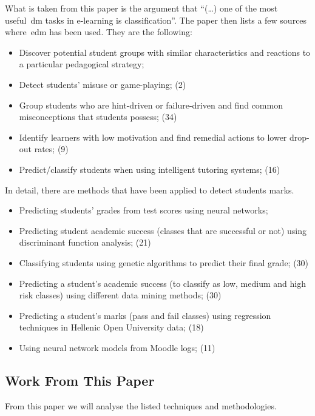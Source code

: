 What is taken from this paper is the argument that ``(\dots) one of the most
useful~\gls{dm} tasks in e-learning is classification''. The paper then lists a
few sources where~\gls{edm} has been used. They are the following:

\begin{itemize}
    \item Discover potential student groups with similar characteristics and
        reactions to a particular pedagogical strategy;~\cite{ind_008}
    \item Detect students' misuse or game-playing; (2)
    \item Group students who are hint-driven or failure-driven and find common
        misconceptions that students possess; (34)
    \item Identify learners with low motivation and find remedial actions to
        lower drop-out rates; (9)
    \item Predict/classify students when using intelligent tutoring systems;
        (16)
\end{itemize}

In detail, there are methods that have been applied to detect students marks.

\begin{itemize}
    \item Predicting students' grades from test scores using neural
        networks;~\cite{ind_009}
    \item Predicting student academic success (classes that are successful or
        not) using discriminant function analysis; (21)
    \item Classifying students using genetic algorithms to predict their final
        grade; (30)
    \item Predicting a student's academic success (to classify as low, medium
        and high risk classes) using different data mining methods; (30)
    \item Predicting a student’s marks (pass and fail classes) using regression
        techniques in Hellenic Open University data; (18)
    \item Using neural network models from Moodle logs; (11)
\end{itemize}

\subsection{Work From This Paper}

From this paper we will analyse the listed techniques and methodologies.

